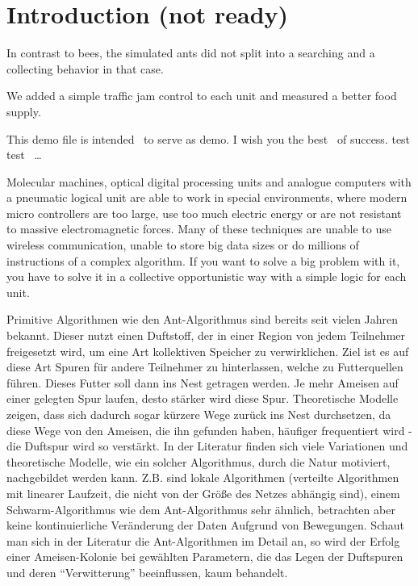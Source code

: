 \section{Introduction (not ready)}\label{introduction-not-ready}

In contrast to bees, the simulated ants did not split into a searching
and a collecting behavior in that case.

We added a simple traffic jam control to each unit and measured a better
food supply.

This demo file is intended~\cite{Tentschert2000} to serve as demo. I wish
you the best~\cite{li2014chaos} of success. test
test~\cite{gonzalez2017smells} \ldots{}

Molecular machines, optical digital processing units and analogue
computers with a pneumatic logical unit are able to work in special
environments, where modern micro controllers are too large, use too much
electric energy or are not resistant to massive electromagnetic forces.
Many of these techniques are unable to use wireless communication,
unable to store big data sizes or do millions of instructions of a
complex algorithm. If you want to solve a big problem with it, you have
to solve it in a collective opportunistic way with a simple logic for
each unit.

Primitive Algorithmen wie den Ant-Algorithmus sind bereits seit vielen
Jahren bekannt. Dieser nutzt einen Duftstoff, der in einer Region von
jedem Teilnehmer freigesetzt wird, um eine Art kollektiven Speicher zu
verwirklichen. Ziel ist es auf diese Art Spuren für andere Teilnehmer zu
hinterlassen, welche zu Futterquellen führen. Dieses Futter soll dann
ins Nest getragen werden. Je mehr Ameisen auf einer gelegten Spur
laufen, desto stärker wird diese Spur. Theoretische Modelle zeigen, dass
sich dadurch sogar kürzere Wege zurück ins Nest durchsetzen, da diese
Wege von den Ameisen, die ihn gefunden haben, häufiger frequentiert wird
- die Duftspur wird so verstärkt. In der Literatur finden sich viele
Variationen und theoretische Modelle, wie ein solcher Algorithmus, durch
die Natur motiviert, nachgebildet werden kann. Z.B. sind lokale
Algorithmen (verteilte Algorithmen mit linearer Laufzeit, die nicht von
der Größe des Netzes abhängig sind), einem Schwarm-Algorithmus wie dem
Ant-Algorithmus sehr ähnlich, betrachten aber keine kontinuierliche
Veränderung der Daten Aufgrund von Bewegungen. Schaut man sich in der
Literatur die Ant-Algorithmen im Detail an, so wird der Erfolg einer
Ameisen-Kolonie bei gewählten Parametern, die das Legen der Duftspuren
und deren ``Verwitterung'' beeinflussen, kaum behandelt.

